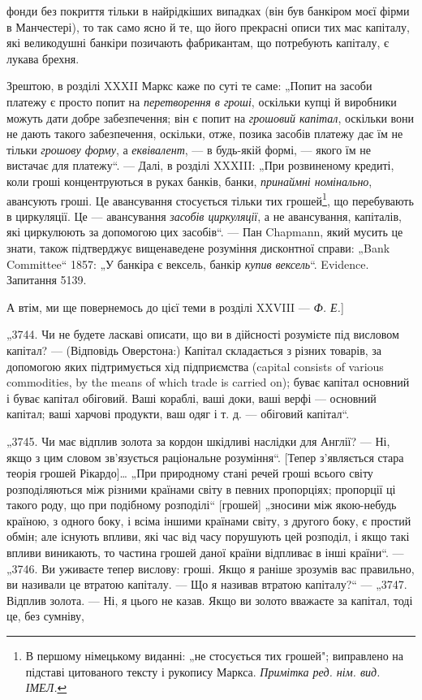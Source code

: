 \parcont{}  %
фонди без покриття тільки в найрідкіших випадках (він був
банкіром моєї фірми в Манчестері), то так само ясно й те, що
його прекрасні описи тих мас капіталу, які великодушні банкіри
позичають фабрикантам, що потребують капіталу, є лукава
брехня.

Зрештою, в розділі XXXII Маркс каже по суті те саме:
„Попит на засоби платежу є просто попит на \emph{перетворення в
гроші}, оскільки купці й виробники можуть дати добре забезпечення; він є попит на \emph{грошовий капітал},
оскільки вони не
дають такого забезпечення, оскільки, отже, позика засобів платежу дає їм не тільки \emph{грошову форму}, а
\emph{еквівалент}, — в будь-якій формі, — якого їм не вистачає для платежу“. — Далі,
в розділі XXXIII: „При розвиненому кредиті, коли гроші концентруються в руках банків, банки,
\emph{принаймні номінально}, авансують гроші. Це авансування стосується тільки тих грошей\footnote*{
В першому німецькому виданні: „не стосується тих грошей"; виправлено
на підставі цитованого тексту і рукопису Маркса. \emph{Примітка ред. нім. вид. ІМЕЛ.}
}, що перебувають
в циркуляції. Це — авансування \emph{засобів
циркуляції}, а не авансування, капіталів, які циркулюють за допомогою цих засобів“. — Пан Chapmann,
який мусить це знати,
також підтверджує вищенаведене розуміння дисконтної справи:
„Bank Committee“ 1857: „У банкіра є вексель, банкір \emph{купив вексель}“. Evidence. Запитання 5139.

А втім, ми ще повернемось до цієї теми в розділі
XXVIII — \emph{Ф. Е.}]

„3744. Чи не будете ласкаві описати, що ви в дійсності розумієте під висловом капітал? — (Відповідь
Оверстона:) Капітал
складається з різних товарів, за допомогою яких підтримується
хід підприємства (capital consists of various commodities, by the
means of which trade is carried on); буває капітал основний і буває капітал обіговий. Ваші кораблі,
ваші доки, ваші верфі —
основний капітал; ваші харчові продукти, ваш одяг і т. д. — обіговий капітал“.

„3745. Чи має відплив золота за кордон шкідливі наслідки для
Англії? — Ні, якщо з цим словом зв’язується раціональне розуміння“. [Тепер з’являється стара теорія
грошей Рікардо]\dots{} „При
природному стані речей гроші всього світу розподіляються між
різними країнами світу в певних пропорціях; пропорції ці такого
роду, що при подібному розподілі“ [грошей] „зносини між якою-небудь країною, з одного боку, і всіма
іншими країнами світу, з другого боку, є простий обмін; але існують впливи, які час
від часу порушують цей розподіл, і якщо такі впливи виникають,
то частина грошей даної країни відпливає в інші країни“. — „3746.
Ви уживаєте тепер вислову: гроші. Якщо я раніше зрозумів вас
правильно, ви називали це втратою капіталу. — Що я називав
втратою капіталу?“ — „3747. Відплив золота. — Ні, я цього не
казав. Якщо ви золото вважаєте за капітал, тоді це, без сумніву,
\parbreak{}  %
